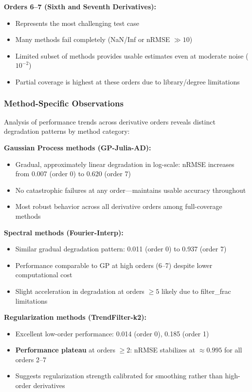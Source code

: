 \textbf{Orders 6--7 (Sixth and Seventh Derivatives):}
\begin{itemize}
    \item Represents the most challenging test case
    \item Many methods fail completely (NaN/Inf or nRMSE $\gg 10$)
    \item Limited subset of methods provides usable estimates even at moderate noise ($10^{-2}$)
    \item Partial coverage is highest at these orders due to library/degree limitations
\end{itemize}

\subsubsection{Method-Specific Observations}

Analysis of performance trends across derivative orders reveals distinct degradation patterns by method category:

\textbf{Gaussian Process methods (GP-Julia-AD):}
\begin{itemize}
    \item Gradual, approximately linear degradation in log-scale: nRMSE increases from 0.007 (order 0) to 0.620 (order 7)
    \item No catastrophic failures at any order—maintains usable accuracy throughout
    \item Most robust behavior across all derivative orders among full-coverage methods
\end{itemize}

\textbf{Spectral methods (Fourier-Interp):}
\begin{itemize}
    \item Similar gradual degradation pattern: 0.011 (order 0) to 0.937 (order 7)
    \item Performance comparable to GP at high orders (6--7) despite lower computational cost
    \item Slight acceleration in degradation at orders $\geq 5$ likely due to filter\_frac limitations
\end{itemize}

\textbf{Regularization methods (TrendFilter-k2):}
\begin{itemize}
    \item Excellent low-order performance: 0.014 (order 0), 0.185 (order 1)
    \item \textbf{Performance plateau} at orders $\geq 2$: nRMSE stabilizes at $\approx 0.995$ for all orders 2--7
    \item Suggests regularization strength calibrated for smoothing rather than high-order derivatives
\end{itemize}

